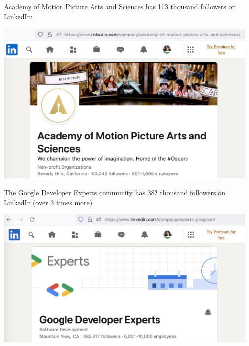 
Academy of Motion Picture Arts and Sciences has 113 thousand followers on LinkedIn:

\includegraphics[width=35em]{linkedin-followers-academy}

The Google Developer Experts community has 382 thousand followers on LinkedIn (over 3 times more):

\includegraphics[width=35em]{linkedin-followers-gde}

\pagebreak
